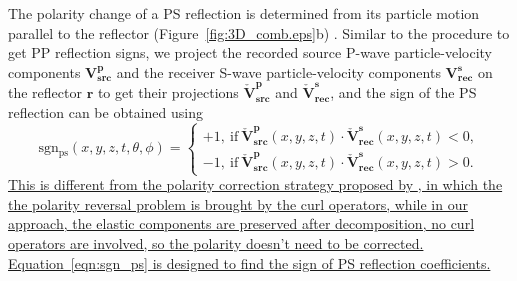 \documentclass[manuscript,ulem,graphix,revised]{geophysics}
\begin{document}
The polarity change of a PS reflection is determined from its particle motion parallel to the reflector (Figure~\ref{fig:3D_comb.eps}b) \citep{aki80}. Similar to the procedure to get PP reflection signs, we project the recorded source P-wave particle-velocity components $\mathbf{V}^{\mathbf{p}}_{\mathbf{src}}$ and the receiver S-wave particle-velocity components $\mathbf{V}^{\mathbf{s}}_{\mathbf{rec}}$ on the reflector $\mathbf{r}$ to get their projections $\check{\mathbf{V}}^{\mathbf{p}}_{\mathbf{src}}$ and $\check{\mathbf{V}}^{\mathbf{s}}_{\mathbf{rec}}$, and the sign of the PS reflection can be obtained using
\begin{equation}
\mathrm{sgn_{ps}}(x,y,z,t,\theta,\phi)=\begin{cases}
 +1, \ \mathrm{if} \ \check{\mathbf{V}}^{\mathbf{p}}_{\mathbf{src}}(x,y,z,t) \cdot \check{\mathbf{V}}^{\mathbf{s}}_{\mathbf{rec}}(x,y,z,t)<0, \\ 
 -1, \ \mathrm{if} \ \check{\mathbf{V}}^{\mathbf{p}}_{\mathbf{src}}(x,y,z,t) \cdot \check{\mathbf{V}}^{\mathbf{s}}_{\mathbf{rec}}(x,y,z,t)>0 .
\end{cases}
\label{eqn:sgn_ps}
\end{equation}
\marginnote{[6]}\uline{This is different from the polarity correction strategy proposed by \mbox{\citet{du12, du14}}, in which the the polarity reversal problem is brought by the curl operators, while in our approach, the elastic components are preserved after decomposition, no curl operators are involved, so the polarity doesn't need to be corrected. Equation~\ref{eqn:sgn_ps} is designed to find the sign of PS reflection coefficients.}
\end{document}
